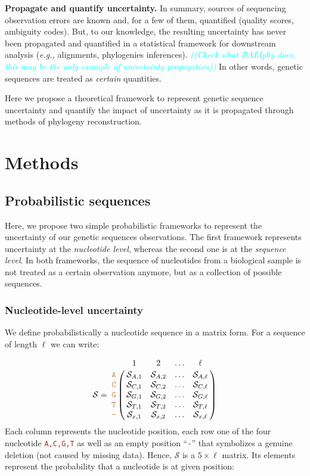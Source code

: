 \documentclass[10pt]{article}
\newcommand{\comment}[1]{\textsl{\textcolor{cyan}{((#1))}}}
\newcommand{\sq}[1]{\texttt{\textcolor{brown}{#1}}}
\newcommand{\eg}{\textit{e.g.,}\xspace}
\newcommand{\nps}{\mathcal{S}} %
\begin{document}
\textbf{Propagate and quantify uncertainty.}
In summary, sources of sequencing observation errors are known and, for a few of them, quantified (quality scores, ambiguity codes).
But, to our knowledge, the resulting uncertainty has never been propagated and quantified in a statistical framework for downstream analysis (\eg alignments,  phylogenies inferences).
\comment{Check what BALIphy does, this may be the only example of uncertainty propagation}
In other words, genetic sequences are treated as \emph{certain} quantities.

\vspace*{5mm}

Here we propose a theoretical framework to represent genetic sequence uncertainty and quantify the impact of uncertainty as it is propagated through methods of phylogeny reconstruction. 







\section{Methods}



\subsection{Probabilistic sequences}

Here, we propose two simple probabilistic frameworks to represent the uncertainty of our genetic sequences observations.
The first framework represents uncertainty at the \emph{nucleotide level}, whereas the second one is at the \emph{sequence level}.
In both frameworks, the sequence of nucleotides from a biological sample is not treated as a certain observation anymore, but as a collection of possible sequences.


\subsubsection{Nucleotide-level uncertainty}
 
We define probabilistically a nucleotide sequence in a matrix form. For a sequence of length $\ell$ we can write:

$$\nps = \bordermatrix{   & 1 & 2 & \ldots & \ell \cr
                \sq{A} & \nps_{A, 1} & \nps_{A, 2} & \ldots & \nps_{A, \ell} \cr
                \sq{C} & \nps_{C, 1} & \nps_{C, 2} & \ldots & \nps_{C, \ell} \cr
                \sq{G} & \nps_{G, 1} & \nps_{G, 2} & \ldots & \nps_{G, \ell} \cr
                \sq{T} & \nps_{T, 1} & \nps_{T, 2} & \ldots & \nps_{T, \ell} \cr 
                \sq{-} & \nps_{x, 1} & \nps_{x, 2} & \ldots & \nps_{x, \ell} \cr 
}$$
Each column represents the nucleotide position, each row one of the four nucleotide \sq{A,C,G,T} as well as an empty position ``\sq{-}'' that symbolizes a genuine deletion (not caused by missing data).
Hence, $\nps$ is a $5\times\ell$ matrix. Its elements represent the probability that a nucleotide is at given position:
\end{document}
